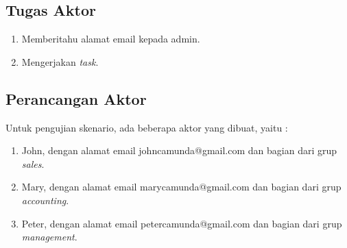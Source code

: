 \subsection{Tugas Aktor}
\label{tugasaktor}
	\begin{enumerate}
	\item Memberitahu alamat email kepada admin.
	\item Mengerjakan \textit{task}.
\end{enumerate}


\subsection{Perancangan Aktor}
\label{perancanganaktor}
Untuk pengujian skenario, ada beberapa aktor yang dibuat, yaitu :
\begin{enumerate}
	\item John, dengan alamat email johncamunda@gmail.com dan bagian dari grup \textit{sales}.
	\item Mary, dengan alamat email marycamunda@gmail.com dan bagian dari grup \textit{accounting}.
	\item Peter, dengan alamat email petercamunda@gmail.com dan bagian dari grup \textit{management}.
\end{enumerate}